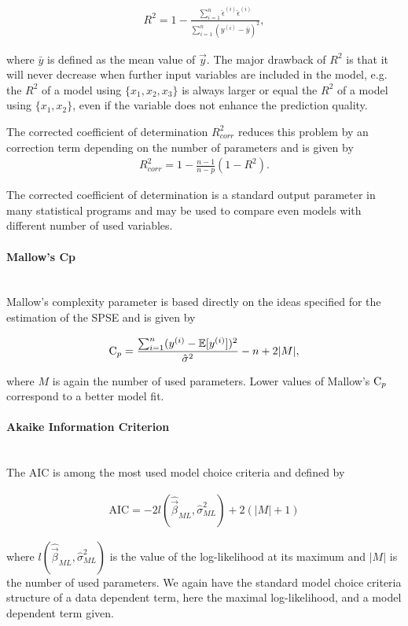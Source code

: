 \documentclass[10pt,a4paper]{report}
\newcommand{\subsubsubsection}[1]{\paragraph{#1}\mbox{}\\}
\begin{document}
\begin{align}
	R^2 = 1 - \frac{\sum_{i=1}^n \hat \epsilon^{(i)} \hat \epsilon^{(i)}}{\sum_{i=1}^n (y^{(i)} - \bar y)^2},
\end{align}

where $\bar y$ is defined as the mean value of $\vec{y}$. The major drawback of $R^2$ is that it will never decrease when further input variables are included in the model, e.g. the $R^2$ of a model using $\{x_1, x_2, x_3\}$ is always larger or equal the $R^2$ of a model using $\{x_1, x_2\}$, even if the variable does not enhance the prediction quality. 

The corrected coefficient of determination $R_{corr}^2$ reduces this problem by an correction term depending on the  number of parameters and is given by
\begin{align}
	R_{corr}^2 = 1 - \frac{n-1}{n-p}(1-R^2).
\end{align}

The corrected coefficient of determination is a standard output parameter in many statistical programs and may be used to compare even models with different number of used variables. \cite{fahrmeir2013regression}

\subsubsubsection{Mallow's Cp}

Mallow's complexity parameter is based directly on the ideas specified for the estimation of the SPSE and is given by

\begin{align}
	\text C_p = \frac{\sum_{i=1}^n (y^{(i)} - \mathbb{E}[y^{(i)}])^2}{\hat \sigma^2} - n + 2 \vert M \vert,
\end{align}

where $M$ is again the number of used parameters. Lower values of Mallow's $\text C_p$ correspond to a better model fit. \cite{fahrmeir2013regression}

\subsubsubsection{Akaike Information Criterion}

The AIC is among the most used model choice criteria and defined by

\begin{align}
	\text{AIC} = -2 l(\hat{\vec{\beta}}_{ML}, \hat \sigma^2_{ML}) + 2(\vert M \vert +1)
\end{align}

where $l(\hat{\vec{\beta}}_{ML}, \hat \sigma^2_{ML})$ is the value of the log-likelihood at its maximum and $\vert M \vert$ is the number of used parameters. We again have the standard model choice criteria structure of a data dependent term, here the maximal log-likelihood, and a model dependent term given. 
\end{document}
